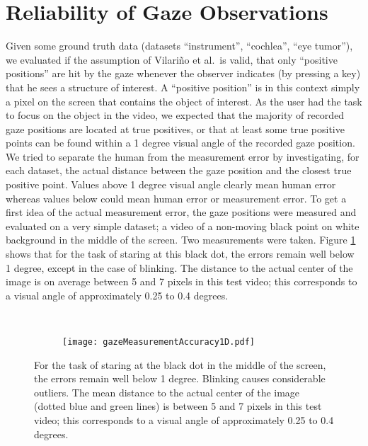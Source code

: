 \section{Reliability of Gaze Observations}
Given some ground truth data (datasets ``instrument'', ``cochlea'', ``eye tumor''), we evaluated if the assumption of Vilari\~no et al.\ is valid, that only ``positive positions'' are hit by the gaze whenever the observer indicates (by pressing a key) that he sees a structure of interest. A ``positive position'' is in this context simply a pixel on the screen that contains the object of interest.
As the user had the task to focus on the object in the video, we expected that the majority of recorded gaze positions are located at true positives, or that at least some true positive points can be found within a 1 degree visual angle of the recorded gaze position. 
We tried to separate the human from the measurement error by investigating, for each dataset, the actual distance between the gaze position and the closest true positive point. 
Values above 1 degree visual angle clearly mean human error whereas values below could mean human error or measurement error. 
To get a first idea of the actual measurement error, the gaze positions were measured and evaluated on a very simple dataset; a video of a non-moving black point on white background in the middle of the screen. 
Two measurements were taken. Figure \ref{fig:gazeMeasurementAccuracy} shows that for the task of staring at this black dot, the errors remain well below 1 degree, except in the case of blinking. 
The distance to the actual center of the image is on average between 5 and 7 pixels in this test video; this corresponds to a visual angle of approximately 0.25 to 0.4 degrees.

\begin{figure}[ht]
	\centering
	\begin{subfigure}[h]{0.41\textwidth}
	      \setlength{\fboxsep}{0pt}%
	      \setlength{\fboxrule}{0.5pt}%
	      \centering
	\end{subfigure}
	~
	\begin{subfigure}[h]{0.48\textwidth}
		\texttt{[image: gazeMeasurementAccuracy1D.pdf]}	
	\end{subfigure}
	\caption{For the task of staring at the black dot in the middle of the screen, the errors remain well below 1 degree. Blinking causes considerable outliers. The mean distance to the actual center of the image (dotted blue and green lines) is between 5 and 7 pixels in this test video; this corresponds to a visual angle of approximately 0.25 to 0.4 degrees.}
	\label{fig:gazeMeasurementAccuracy}
\end{figure}


